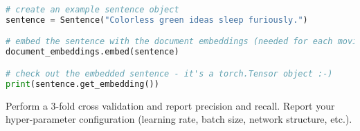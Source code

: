 \begin{enumerate}[label=\alph*)]
\begin{lstlisting}[language=Python, breaklines=true, caption=Embedding documents using flair]
# create an example sentence object
sentence = Sentence("Colorless green ideas sleep furiously.")

# embed the sentence with the document embeddings (needed for each movie review)
document_embeddings.embed(sentence)

# check out the embedded sentence - it's a torch.Tensor object :-)
print(sentence.get_embedding())
\end{lstlisting}

Perform a 3-fold cross validation and report precision and recall. Report your hyper-parameter configuration (learning rate, batch size, network structure, etc.).



\pagebreak
{}



\end{enumerate}

